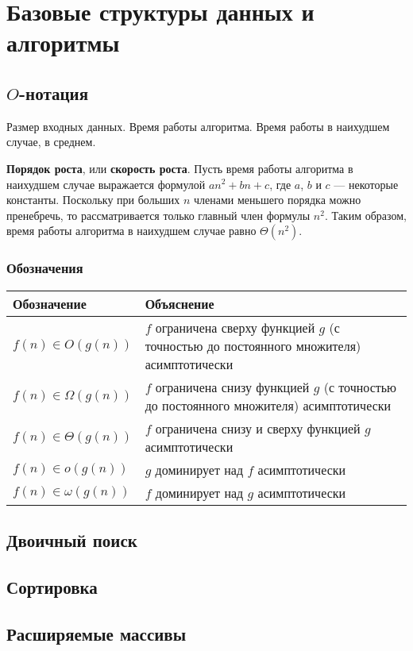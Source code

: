 \chapter{Базовые структуры данных и алгоритмы}
\label{ch:basic-ds}

\section{$O$-нотация}
\label{sec:o-notation}

Размер входных данных. Время работы алгоритма. Время работы в наихудшем случае, в среднем.

\textbf{Порядок роста}, или \textbf{скорость роста}. Пусть время работы алгоритма в наихудшем случае выражается формулой $an^2 + bn + c$, где $a$, $b$ и $c$ --- некоторые константы. Поскольку при больших $n$ членами меньшего порядка можно пренебречь, то рассматривается только главный член формулы $n^2$. Таким образом, время работы алгоритма в наихудшем случае равно $\Theta(n^2)$.

\subsection{Обозначения}
\begin{tabular}{lp{8cm}}
  \toprule
  Обозначение & Объяснение \\
  \midrule
  $f(n) \in O(g(n))$ & $f$ ограничена сверху функцией $g$ (с точностью до постоянного множителя) асимптотически \\
  $f(n) \in \Omega(g(n))$ & $f$ ограничена снизу функцией $g$ (с точностью до постоянного множителя) асимптотически \\
  $f(n) \in \Theta(g(n))$ & $f$ ограничена снизу и сверху функцией $g$ асимптотически \\
  $f(n) \in o(g(n))$ & $g$ доминирует над $f$ асимптотически \\
  $f(n) \in \omega(g(n))$ & $f$ доминирует над $g$ асимптотически \\
  \bottomrule
\end{tabular}

\section{Двоичный поиск}
\label{sec:binary-search}
\section{Сортировка}
\label{sec:sorting}
\section{Расширяемые массивы}
\label{sec:ext-arrays}
